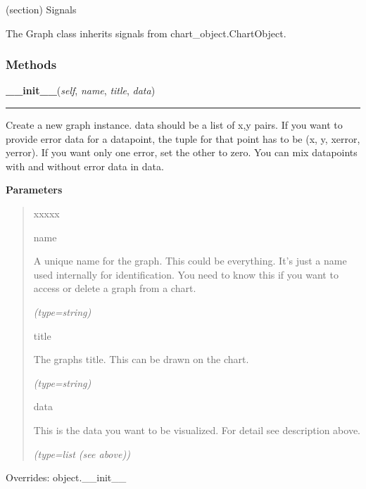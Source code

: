 (section) Signals

  The Graph class inherits signals from chart\_object.ChartObject.



  \subsubsection{Methods}

    \vspace{0.5ex}

\hspace{.8\funcindent}\begin{boxedminipage}{\funcwidth}

    \raggedright \textbf{\_\_init\_\_}(\textit{self}, \textit{name}, \textit{title}, \textit{data})

    \vspace{-1.5ex}

    \rule{\textwidth}{0.5\fboxrule}
\setlength{\parskip}{2ex}
    Create a new graph instance. data should be a list of x,y pairs. If you
    want to provide error data for a datapoint, the tuple for that point 
    has to be (x, y, xerror, yerror). If you want only one error, set the 
    other to zero. You can mix datapoints with and without error data in 
    data.

\setlength{\parskip}{1ex}
      \textbf{Parameters}
      \vspace{-1ex}

      \begin{quote}
        \begin{Ventry}{xxxxx}

          \item[name]

          A unique name for the graph. This could be everything. It's just 
          a name used internally for identification. You need to know this 
          if you want to access or delete a graph from a chart.

            {\it (type=string)}

          \item[title]

          The graphs title. This can be drawn on the chart.

            {\it (type=string)}

          \item[data]

          This is the data you want to be visualized. For detail see 
          description above.

            {\it (type=list (see above))}

        \end{Ventry}

      \end{quote}

      Overrides: object.\_\_init\_\_

    \end{boxedminipage}

